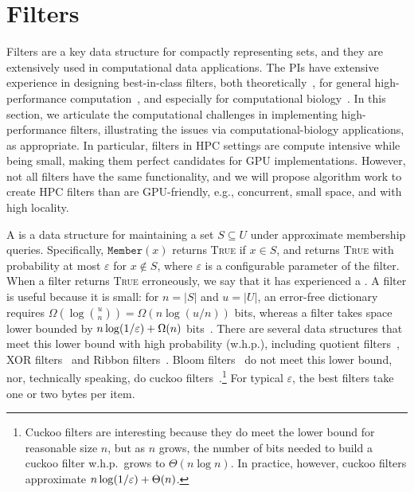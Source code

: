 
\section{Filters}

Filters are a key data structure for compactly representing sets, and they are extensively used in computational data applications.  The PIs have extensive experience in designing best-in-class filters, both theoretically~\cite{BenderFaGo18,BenderDaFa21,BenderFaKu22b,BenderCoFa23b}, for general high-performance computation~\cite{conway2020splinterdb,PandeyBeCo23,PandeyBJP17,BenderFaJo12}, and especially for computational biology~\cite{AlmodaresiPFJP19,PandeyAlBe18,PandeyBeJo18, almodaresi2017rainbowfish,PandeyBeJo17b}.
In this section, we articulate the computational challenges in implementing high-performance filters, illustrating the issues via computational-biology applications, as appropriate. 
In particular, filters in HPC settings are compute intensive while being small, making them perfect candidates for GPU implementations.  
However, not all filters have the same functionality, and we will propose algorithm work to create HPC filters than are GPU-friendly, e.g., concurrent, small space, and with high locality.



A  is a data structure for maintaining a set $S\subseteq U$ under approximate membership queries. Specifically, $\texttt{Member}(x)$ returns \textsc{True} if $x\in S$, and returns \textsc{True} with probability at most $\varepsilon$ for $x\notin S$, where $\varepsilon$ is a configurable parameter of the filter.  When a filter returns \textsc{True} erroneously, we say that it has experienced a .
%
A filter is useful because it is small: for $n= |S|$ and $u = |U|$, an error-free dictionary requires $\Omega\left(\log \binom{u}{n}\right) = \Omega(n \log (u/n))$ bits, whereas a filter  takes space lower bounded by $n\log (1/\varepsilon) + \Omega(n)$ bits~\cite{CarterFG78}.  There are several data structures that meet this lower bound with high probability (w.h.p.), including quotient filters~\cite{Cleary84,PaghPaRa05,DillingerM09,BenderFaJo12,PandeyBJP17,PandeyCDBFJ21}, XOR filters~\cite{GrafLe20} and Ribbon filters~\cite{DillingerW21}.  Bloom filters~\cite{Bloom70} do not meet this lower bound, nor, technically speaking, do cuckoo filters~\cite{FanAnKa14,BreslowJ18}.\footnote{Cuckoo filters are interesting because they do meet the lower bound for reasonable size $n$, but as $n$ grows, the number of bits needed to build a cuckoo filter w.h.p.\ grows to $\Theta(n\log n)$.  In practice, however, cuckoo filters approximate $n\log (1/\varepsilon) + \Theta(n)$.}
%
For typical $\varepsilon$, the best filters take one or two bytes per item.

